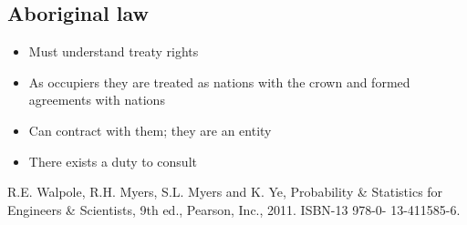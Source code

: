 \documentclass[10pt]{article}
\begin{document}
\subsection{Aboriginal law}

\begin{itemize}
	\item Must understand treaty rights 
	\item As occupiers they are treated as nations with the crown and formed agreements with nations
	\item Can contract with them; they are an entity
	\item There exists a duty to consult
\end{itemize}









\begin{thebibliography}{99}
R.E. Walpole, R.H. Myers, S.L. Myers and K. Ye, Probability \& Statistics for Engineers \& Scientists, 9th ed., Pearson, Inc., 2011. ISBN-13 978-0- 13-411585-6.

\end{thebibliography}
\end{document}
